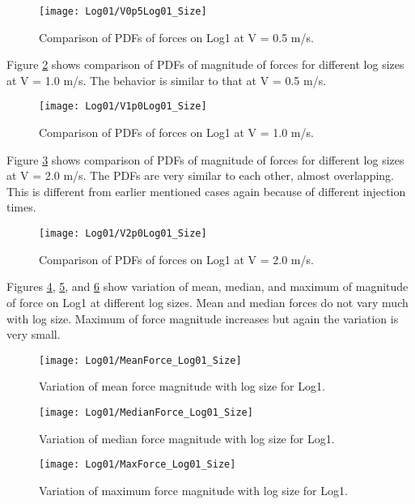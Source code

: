 \begin{figure}
\centering
\texttt{[image: Log01/V0p5Log01\_Size]}
\caption{\label{fig:V0p5Log01_Size}Comparison of PDFs of forces on Log1 at V = 0.5 m/s.}
\end{figure}

\noindent Figure \ref{fig:V1p0Log01_Size} shows comparison of PDFs of magnitude of forces for different log sizes at V = 1.0 m/s. The behavior is similar to that at V = 0.5 m/s.

\begin{figure}
\centering
\texttt{[image: Log01/V1p0Log01\_Size]}
\caption{\label{fig:V1p0Log01_Size}Comparison of PDFs of forces on Log1 at V = 1.0 m/s.}
\end{figure}

\noindent Figure \ref{fig:V2p0Log01_Size} shows comparison of PDFs of magnitude of forces for different log sizes at V = 2.0 m/s. The PDFs are very similar to each other, almost overlapping. This is different from earlier mentioned cases again because of different injection times. 

\begin{figure}
\centering
\texttt{[image: Log01/V2p0Log01\_Size]}
\caption{\label{fig:V2p0Log01_Size}Comparison of PDFs of forces on Log1 at V = 2.0 m/s.}
\end{figure}

\noindent Figures \ref{fig:MeanForce_Log01_Size}, \ref{fig:MedianForce_Log01_Size}, and \ref{fig:MaxForce_Log01_Size} show variation of mean, median, and maximum of magnitude of force on Log1 at different log sizes. Mean and median forces do not vary much with log size. Maximum of force magnitude increases but again the variation is very small. 

\begin{figure}
\centering
\texttt{[image: Log01/MeanForce\_Log01\_Size]}
\caption{\label{fig:MeanForce_Log01_Size}Variation of mean force magnitude with log size for Log1.}
\end{figure}
\begin{figure}
\centering
\texttt{[image: Log01/MedianForce\_Log01\_Size]}
\caption{\label{fig:MedianForce_Log01_Size}Variation of median force magnitude with log size for Log1.}
\end{figure}
\begin{figure}
\centering
\texttt{[image: Log01/MaxForce\_Log01\_Size]}
\caption{\label{fig:MaxForce_Log01_Size}Variation of maximum force magnitude with log size for Log1.}
\end{figure}

